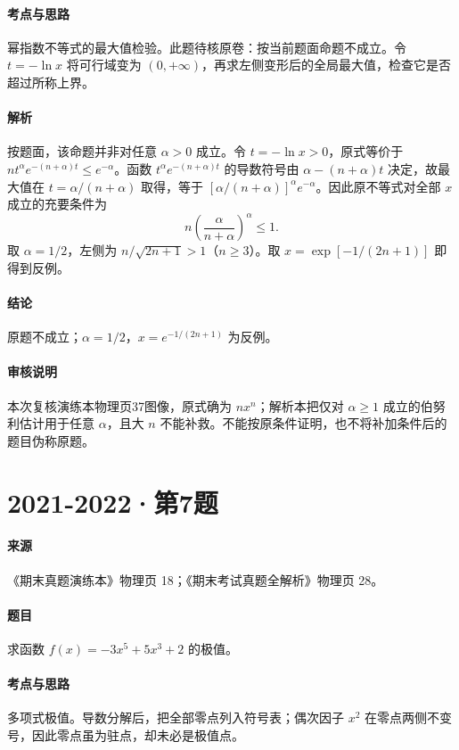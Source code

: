 \documentclass[UTF8,fontset=fandol,12pt,oneside,openany]{ctexrep}
\theoremstyle{definition}
\begin{document}
\paragraph{考点与思路}
幂指数不等式的最大值检验。此题待核原卷：按当前题面命题不成立。令 $t=-\ln x$ 将可行域变为 $(0,+\infty)$，再求左侧变形后的全局最大值，检查它是否超过所称上界。
\paragraph{解析}
按题面，该命题并非对任意 $\alpha>0$ 成立。令 $t=-\ln x>0$，原式等价于 $nt^\alpha e^{-(n+\alpha)t}\le e^{-\alpha}$。函数 $t^\alpha e^{-(n+\alpha)t}$ 的导数符号由 $\alpha-(n+\alpha)t$ 决定，故最大值在 $t=\alpha/(n+\alpha)$ 取得，等于 $[\alpha/(n+\alpha)]^\alpha e^{-\alpha}$。因此原不等式对全部 $x$ 成立的充要条件为
\[n\left(\frac{\alpha}{n+\alpha}\right)^\alpha\le1.\]
取 $\alpha=1/2$，左侧为 $n/\sqrt{2n+1}>1$（$n\ge3$）。取 $x=\exp[-1/(2n+1)]$ 即得到反例。
\paragraph{结论}
原题不成立；$\alpha=1/2$，$x=e^{-1/(2n+1)}$ 为反例。
\paragraph{审核说明}
本次复核演练本物理页37图像，原式确为 $nx^n$；解析本把仅对 $\alpha\ge1$ 成立的伯努利估计用于任意 $\alpha$，且大 $n$ 不能补救。不能按原条件证明，也不将补加条件后的题目伪称原题。

\par\addvspace{18pt}\noindent\begin{minipage}{\linewidth}
\section{2021-2022·第7题}
\paragraph{来源}《期末真题演练本》物理页 18；《期末考试真题全解析》物理页 28。
\paragraph{题目}
求函数 $f(x)=-3x^5+5x^3+2$ 的极值。
\end{minipage}\par
\paragraph{考点与思路}
多项式极值。导数分解后，把全部零点列入符号表；偶次因子 $x^2$ 在零点两侧不变号，因此零点虽为驻点，却未必是极值点。
\end{document}
